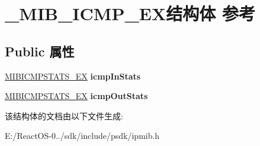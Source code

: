 \hypertarget{struct___m_i_b___i_c_m_p___e_x}{}\section{\+\_\+\+M\+I\+B\+\_\+\+I\+C\+M\+P\+\_\+\+E\+X结构体 参考}
\label{struct___m_i_b___i_c_m_p___e_x}
\subsection*{Public 属性}
\begin{DoxyCompactItemize}
\item 
\mbox{\label{struct___m_i_b___i_c_m_p___e_x_ab8ed7dc4812eeafbdceaab32cd1d4412}} 
\hyperlink{struct___m_i_b_i_c_m_p_s_t_a_t_s___e_x}{M\+I\+B\+I\+C\+M\+P\+S\+T\+A\+T\+S\+\_\+\+EX} {\bfseries icmp\+In\+Stats}
\item 
\mbox{\label{struct___m_i_b___i_c_m_p___e_x_a21b4312fcdff725f1857543e52d60c3d}} 
\hyperlink{struct___m_i_b_i_c_m_p_s_t_a_t_s___e_x}{M\+I\+B\+I\+C\+M\+P\+S\+T\+A\+T\+S\+\_\+\+EX} {\bfseries icmp\+Out\+Stats}
\end{DoxyCompactItemize}


该结构体的文档由以下文件生成\+:\begin{DoxyCompactItemize}
\item 
E\+:/\+React\+O\+S-\/0../sdk/include/psdk/ipmib.\+h\end{DoxyCompactItemize}
